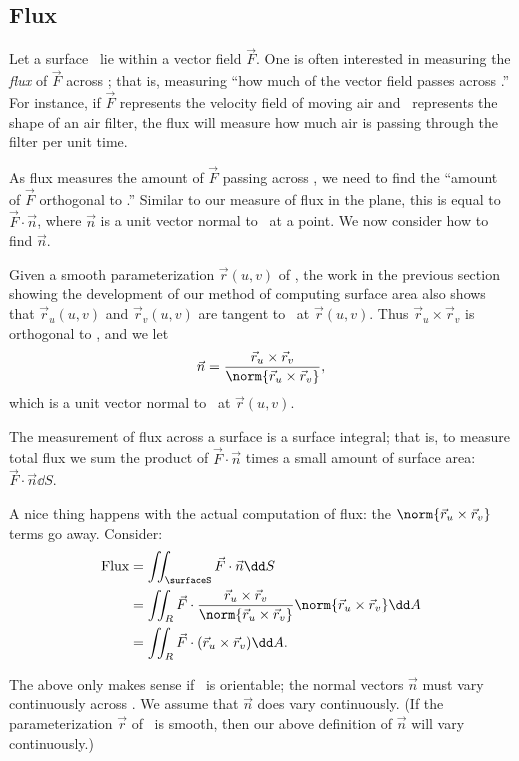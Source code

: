 \subsection{Flux}

Let a surface \surfaceS\ lie within a vector field $\vec F$. One is often interested in measuring the \emph{flux} of $\vec F$ across \surfaceS; that is, measuring ``how much of the vector field passes across \surfaceS.'' For instance, if $\vec F$ represents the velocity field of moving air and \surfaceS\ represents the shape of an air filter, the flux will measure how much air is passing through the filter per unit time.

As flux measures the amount of $\vec F$ passing across \surfaceS, we need to find the ``amount of $\vec F$ orthogonal to \surfaceS.'' Similar to our measure of flux in the plane, this is equal to $\vec F\cdot \vec n$, where $\vec n$ is a unit vector normal to \surfaceS\ at a point. We now consider how to find $\vec n$.

Given a smooth parameterization $\vec r(u,v)$ of \surfaceS, the work in the previous section showing the development of our method of computing surface area also shows that $\vec r_u(u,v)$ and $\vec r_v(u,v)$ are tangent to \surfaceS\ at $\vec r(u,v)$. Thus $\vec r_u\times \vec r_v$ is orthogonal to \surfaceS, and we let
\[\vec n = \frac{\vec r_u\times \vec r_v}{\norm{\vec r_u\times \vec r_v}},\]
which is a unit vector normal to \surfaceS\ at $\vec r(u,v)$.

The measurement of flux across a surface is a surface integral; that is, to measure total flux we sum the product of $\vec F\cdot\vec n$ times a small amount of surface area: $\vec F\cdot \vec n\dd S$. 

A nice thing happens with the actual computation of flux: the $\norm{\vec r_u\times \vec r_v}$ terms go away. Consider:
\begin{align*}
	\text{Flux}
	&= \iint_\surfaceS \vec F\cdot \vec n\dd S \\
	&= \iint_R \vec F\cdot \frac{\vec r_u\times \vec r_v}{\norm{\vec r_u\times \vec r_v}}\norm{\vec r_u\times \vec r_v}\dd A \\
	&= \iint_R \vec F\cdot (\vec r_u\times \vec r_v)\dd A.
\end{align*}

The above only makes sense if \surfaceS\ is orientable; the normal vectors $\vec n$ must vary continuously across \surfaceS. We assume that $\vec n$ does vary continuously. (If the parameterization $\vec r$ of \surfaceS\ is smooth, then our above definition of $\vec n$ will vary continuously.)

